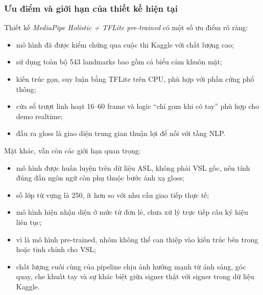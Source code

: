 \subsubsection{Ưu điểm và giới hạn của thiết kế hiện tại}

Thiết kế \textit{MediaPipe Holistic + TFLite pre-trained} có một số ưu điểm rõ ràng:
\begin{itemize}
    \item mô hình đã được kiểm chứng qua cuộc thi Kaggle với chất lượng cao;
    \item sử dụng toàn bộ 543 landmarks bao gồm cả biểu cảm khuôn mặt;
    \item kiến trúc gọn, suy luận bằng TFLite trên CPU, phù hợp với phần cứng phổ thông;
    \item cửa sổ trượt linh hoạt 16--60 frame và logic ``chỉ gom khi có tay'' phù hợp cho
    demo realtime;
    \item đầu ra gloss là giao diện trung gian thuận lợi để nối với tầng NLP.
\end{itemize}

Mặt khác, vẫn còn các giới hạn quan trọng:
\begin{itemize}
    \item mô hình được huấn luyện trên dữ liệu ASL, không phải VSL gốc, nên tính đúng đắn
    ngôn ngữ còn phụ thuộc bước ánh xạ gloss;
    \item số lớp từ vựng là 250, ít hơn so với nhu cầu giao tiếp thực tế;
    \item mô hình hiện nhận diện ở mức từ đơn lẻ, chưa xử lý trực tiếp câu ký hiệu liên tục;
    \item vì là mô hình pre-trained, nhóm không thể can thiệp vào kiến trúc bên trong hoặc
    tinh chỉnh cho VSL;
    \item chất lượng cuối cùng của pipeline chịu ảnh hưởng mạnh từ ánh sáng, góc quay, che khuất
    tay và sự khác biệt giữa signer thật với signer trong dữ liệu Kaggle.
\end{itemize}

